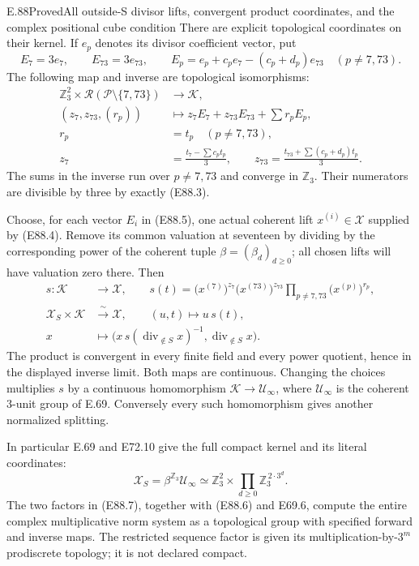 \begin{statement}{E.88}{Proved}{All outside-S divisor lifts, convergent product coordinates, and the complex positional cube condition}
There are explicit topological coordinates on their
kernel. If $e_p$ denotes its divisor coefficient vector,
put
\[
 E_7=3e_7,\qquad E_{73}=3e_{73},\qquad
 E_p=e_p+c_pe_7-(c_p+d_p)e_{73}
                       \quad(p\ne7,73).
 \tag{E88.5}
\]
The following map and inverse are topological
isomorphisms:
\[
 \begin{split}
 \mathbb Z_3^2\times\mathscr R(\mathcal P\setminus\{7,73\})
       &\longrightarrow\mathcal K,\\
 (z_7,z_{73},(r_p))
       &\longmapsto z_7E_7+z_{73}E_{73}+\sum r_pE_p,\\
 r_p&=t_p\quad(p\ne7,73),\\
 z_7&=\frac{t_7-\sum c_pt_p}{3},\qquad
 z_{73}=\frac{t_{73}+\sum(c_p+d_p)t_p}{3}.
 \end{split}
 \tag{E88.6}
\]
The sums in the inverse run over $p\ne7,73$ and converge
in $\mathbb Z_3$. Their numerators are divisible by three
by exactly (E88.3).

Choose, for each vector $E_i$ in (E88.5), one actual
coherent lift $x^{(i)}\in\mathcal X$ supplied by (E88.4).
Remove its common valuation at seventeen by dividing by
the corresponding power of the coherent tuple
$\beta=(\beta_d)_{d\ge0}$; all chosen lifts will have
valuation zero there. Then
\[
 \begin{split}
 s:\mathcal K&\longrightarrow\mathcal X,\qquad
 s(t)=\bigl(x^{(7)}\bigr)^{z_7}
       \bigl(x^{(73)}\bigr)^{z_{73}}
           \prod_{p\ne7,73}\bigl(x^{(p)}\bigr)^{r_p},\\
 \mathcal X_S\times\mathcal K&\xrightarrow{\ \sim\ }\mathcal X,
                   \qquad (u,t)\longmapsto u\,s(t),\\
 x&\longmapsto
   \bigl(x\,s(\operatorname{div}_{\notin S}x)^{-1},
                       \operatorname{div}_{\notin S}x\bigr).
 \end{split}
 \tag{E88.7}
\]
The product is convergent in every finite field and
every power quotient, hence in the displayed inverse
limit. Both maps are continuous. Changing the choices
multiplies $s$ by a continuous homomorphism
$\mathcal K\to\mathcal U_\infty$, where
$\mathcal U_\infty$ is the coherent $3$-unit group
of E.69. Conversely every such homomorphism gives
another normalized splitting.

In particular E.69 and E72.10 give the full compact
kernel and its literal coordinates:
\[
 \mathcal X_S=\beta^{\mathbb Z_3}\mathcal U_\infty
 \simeq \mathbb Z_3^2
                \times\prod_{d\ge0}\mathbb Z_3^{\,2\cdot3^d}.
 \tag{E88.8}
\]
The two factors in (E88.7), together with (E88.6)
and E69.6, compute the entire complex multiplicative
norm system as a topological group with specified
forward and inverse maps. The restricted sequence
factor is given its multiplication-by-$3^m$
prodiscrete topology; it is not declared compact.


\end{statement}
